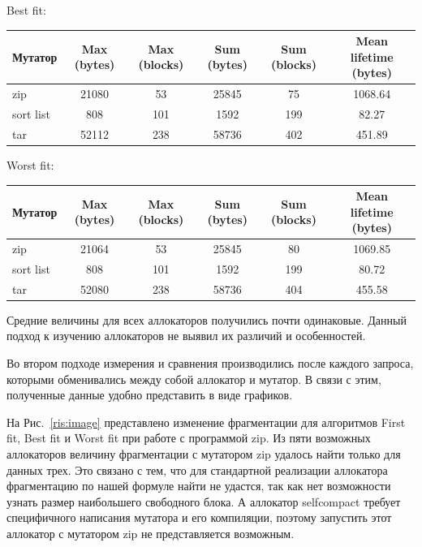     Best fit:

    \begin{center}
    \begin{tabular}{| l | c | c | c | c | c |}
    \hline
    Мутатор & Max (bytes) & Max (blocks) & Sum (bytes) & Sum (blocks) & Mean lifetime (bytes)\\
    \hline
    zip & 21080 & 53 & 25845 & 75 & 1068.64\\
    \hline
    sort list & 808 & 101 & 1592 & 199 & 82.27 \\
    \hline
    tar & 52112 & 238 & 58736 & 402 & 451.89 \\
    \hline
    \end{tabular}
    \end{center}
    
    Worst fit:

    \begin{center}
    \begin{tabular}{| l | c | c | c | c | c |}
    \hline
    Мутатор & Max (bytes) & Max (blocks) & Sum (bytes) & Sum (blocks) & Mean lifetime (bytes)\\
    \hline
    zip & 21064 & 53 & 25845 & 80 & 1069.85\\
    \hline
    sort list & 808 & 101 & 1592 & 199 & 80.72\\
    \hline
    tar & 52080 & 238 & 58736 & 404 & 455.58 \\
    \hline
    \end{tabular}
    \end{center}
    
Средние величины для всех аллокаторов получились почти одинаковые. Данный подход к изучению аллокаторов не выявил их различий и особенностей.
   
Во втором подходе измерения и сравнения производились после каждого запроса, которыми обменивались между собой аллокатор и мутатор. В связи с этим,
 полученные данные удобно представить в виде графиков.
   
На Рис.~\ref{ris:image} представлено изменение фрагментации для алгоритмов First fit, Best fit и Worst fit при работе с программой zip. 
Из пяти возможных аллокаторов величину фрагментации с мутатором zip удалось найти только для данных трех. Это связано с тем, что для стандартной 
реализации аллокатора фрагментацию по нашей формуле найти не удастся, так как нет возможности узнать размер наибольшего свободного блока. 
А аллокатор selfcompact требует специфичного написания мутатора и его компиляции, поэтому запустить этот аллокатор с 
мутатором zip не представляется возможным.
   

